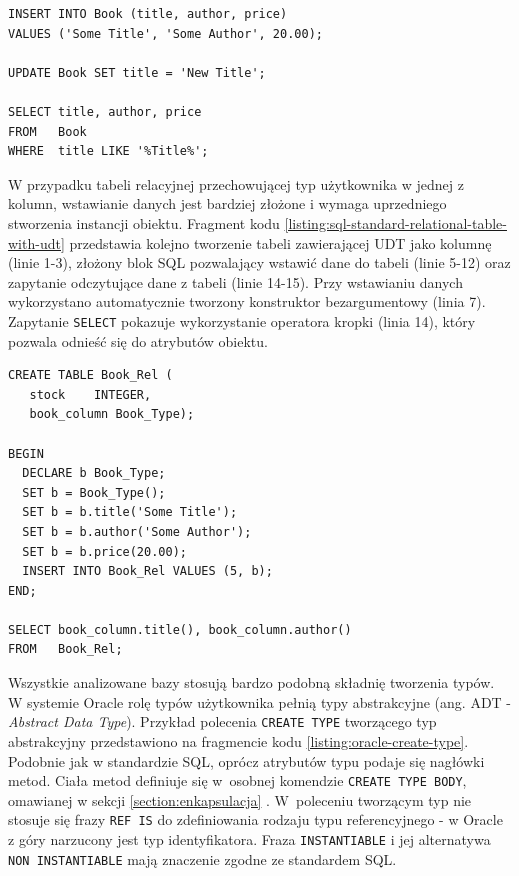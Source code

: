 \documentclass[a4paper,twoside,12pt]{book}
\begin{document}
\begin{lstlisting}[style=SQL, caption={Operacje na typowanej tabeli według standardu SQL.}, label={listing:sql-standard-typed-table-queries}, captionpos=b]
INSERT INTO Book (title, author, price)
VALUES ('Some Title', 'Some Author', 20.00);

UPDATE Book SET title = 'New Title';

SELECT title, author, price
FROM   Book
WHERE  title LIKE '%Title%';
\end{lstlisting}

W przypadku tabeli relacyjnej przechowującej typ użytkownika w jednej z kolumn, wstawianie danych jest bardziej złożone i wymaga uprzedniego stworzenia instancji obiektu. Fragment kodu \ref{listing:sql-standard-relational-table-with-udt} przedstawia kolejno tworzenie tabeli zawierającej UDT jako kolumnę (linie 1-3), złożony blok SQL pozwalający wstawić dane do tabeli (linie 5-12) oraz zapytanie odczytujące dane z tabeli (linie 14-15). Przy wstawianiu danych wykorzystano automatycznie tworzony konstruktor bezargumentowy (linia 7). Zapytanie \lstinline{SELECT} pokazuje wykorzystanie operatora kropki (linia 14), który pozwala odnieść się do atrybutów obiektu.

\begin{lstlisting}[style=SQL, caption={Wykorzystanie UDT jako kolumny według standardu SQL.}, label={listing:sql-standard-relational-table-with-udt}, captionpos=b]
CREATE TABLE Book_Rel (
   stock    INTEGER,
   book_column Book_Type);

BEGIN                                 
  DECLARE b Book_Type;                
  SET b = Book_Type();                  
  SET b = b.title('Some Title'); 
  SET b = b.author('Some Author');    
  SET b = b.price(20.00);     
  INSERT INTO Book_Rel VALUES (5, b);         
END;              

SELECT book_column.title(), book_column.author()
FROM   Book_Rel;
\end{lstlisting}

Wszystkie analizowane bazy stosują bardzo podobną składnię tworzenia typów. W systemie Oracle rolę typów użytkownika pełnią typy abstrakcyjne (ang. ADT - \textit{Abstract Data Type}). Przykład polecenia \lstinline{CREATE TYPE} tworzącego typ abstrakcyjny przedstawiono na fragmencie kodu \ref{listing:oracle-create-type}. Podobnie jak w standardzie SQL, oprócz atrybutów typu podaje się nagłówki metod. Ciała metod definiuje się w~osobnej komendzie \lstinline{CREATE TYPE BODY}, omawianej w sekcji \ref{section:enkapsulacja} . W~poleceniu tworzącym typ nie stosuje się frazy \lstinline{REF IS} do zdefiniowania rodzaju typu referencyjnego - w Oracle z góry narzucony jest typ identyfikatora. Fraza \lstinline{INSTANTIABLE} i jej alternatywa \lstinline{NON INSTANTIABLE} mają znaczenie zgodne ze standardem SQL.
\end{document}
